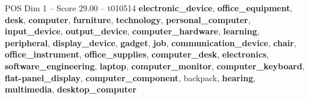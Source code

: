 \begin{textsample}{POS Dim 1 – Score 29.00 – t010514}  \label{ex:f1_pos_019}
\textbf{electronic\_device}, \textbf{office\_equipment}, \textbf{desk}, \textbf{computer}, \textbf{furniture}, \textbf{technology}, \textbf{personal\_computer}, \textbf{input\_device}, \textbf{output\_device}, \textbf{computer\_hardware}, \textbf{learning}, \textbf{peripheral}, \textbf{display\_device}, \textbf{gadget}, \textbf{job}, \textbf{communication\_device}, \textbf{chair}, \textbf{office\_instrument}, \textbf{office\_supplies}, \textbf{computer\_desk}, \textbf{electronics}, \textbf{software\_engineering}, \textbf{laptop}, \textbf{computer\_monitor}, \textbf{computer\_keyboard}, \textbf{flat-panel\_display}, \textbf{computer\_component}, backpack, \textbf{hearing}, \textbf{multimedia}, \textbf{desktop\_computer}

\end{textsample}
